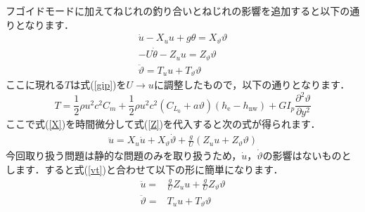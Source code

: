\documentclass{jarticle}
\begin{document}
フゴイドモードに加えてねじれの釣り合いとねじれの影響を追加すると以下の通りとなります．
\begin{align} 
    \dot{u} - X_u u + g \theta = X_\vartheta \vartheta \label{X}\\
    -U\dot{\theta} - Z_u u = Z_\vartheta \vartheta \label{Z} \\
    \ddot{\vartheta} = T_u u + T_\vartheta \vartheta \label{vt}
\end{align}
ここに現れる$T$は式(\ref{gip})を$U \rightarrow u$に調整したもので，以下の通りとなります．
\begin{equation}
    T = \frac{1}{2}\rho u^2 c^2 C_m + \frac{1}{2}\rho u^2 c^2 (C_{L_0} + a\vartheta)  (h_\mathrm{e}-h_\mathrm{nw}) + GI_p \frac{\partial^2 \vartheta}{\partial y^2}
\end{equation}
ここで式(\ref{X})を時間微分して式(\ref{Z})を代入すると次の式が得られます．
\begin{align}
    \ddot{u} = X_u \dot{u} + X_\vartheta \dot{\vartheta} + \frac{g}{U} (Z_u u + Z_\vartheta \vartheta) 
\end{align}
今回取り扱う問題は静的な問題のみを取り扱うため，$\dot{u}，\dot{\vartheta}$の影響はないものとします．すると式(\ref{vt})と合わせて以下の形に簡単になります．
\begin{align}
    \ddot{u} =&   \frac{g}{U}Z_u u + \frac{g}{U}Z_\vartheta \vartheta \\
    \ddot{\vartheta} =& T_u u + T_\vartheta \vartheta
\end{align}
\end{document}
